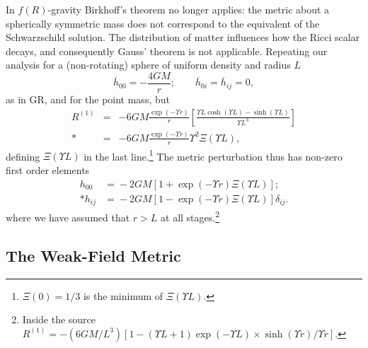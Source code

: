 \documentclass[aps,prd,amsfonts,amssymb,amsmath,nofootinbib,reprint,showpacs]{revtex4-1}
\begin{document}
In $f(R)$-gravity Birkhoff's theorem no longer applies: the metric about a spherically symmetric mass does not correspond to the equivalent of the Schwarzschild solution. The distribution of matter influences how the Ricci scalar decays, and consequently Gauss' theorem is not applicable. Repeating our analysis for a (non-rotating) sphere of uniform density and radius $L$
\begin{equation}
\overline{h}_{00} = -\frac{4GM}{r}; \qquad \overline{h}_{0i} = \overline{h}_{ij} = 0,
\end{equation}
as in GR, and for the point mass, but
\begin{eqnarray}
R^{(1)} & = & -6 G M \frac{\exp(- \Upsilon r)}{r}\left[\frac{\Upsilon L\cosh(\Upsilon L) - \sinh(\Upsilon L)}{\Upsilon L^3}\right] \nonumber \\*
 & = &  -6 G M \frac{\exp(- \Upsilon r)}{r}\Upsilon^2\Xi(\Upsilon L),
\end{eqnarray}
defining $\Xi(\Upsilon L)$ in the last line.\footnote{$\Xi(0) = 1/3$ is the minimum of $\Xi(\Upsilon L)$.} The metric perturbation thus has non-zero first order elements~\cite{Stelle1978, Capozziello2009b, Stabile2010}
\begin{equation}
\begin{split}
h_{00} & = {} -2 G M \left[1 + \exp(- \Upsilon r)\Xi(\Upsilon L)\right]; \\*
h_{ij} & = {} -2 G M \left[1 - \exp(- \Upsilon r)\Xi(\Upsilon L)\right]\delta_{ij}.
\label{eq:Uniform}
\end{split}
\end{equation}
where we have assumed that $r > L$ at all stages.\footnote{Inside the source $R^{(1)} = -{(6 G M/{L^3})}[1 - (\Upsilon L + 1)\exp(-\Upsilon L) \times\sinh(\Upsilon r)/\Upsilon r]$.}

\subsection{The Weak-Field Metric}
\end{document}
